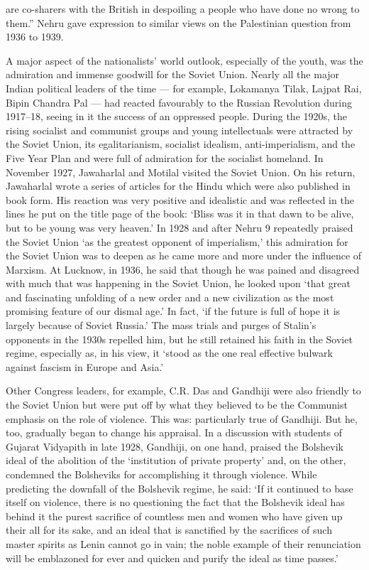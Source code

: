 \begin{multicols}{2}
are co-sharers with the British in despoiling a people who have done no wrong to them.'' Nehru gave expression to similar views on the Palestinian question from 1936 to 1939. 

A major aspect of the nationalists' world outlook, especially of the youth, was the admiration and immense goodwill for the Soviet Union. Nearly all the major Indian political leaders of the time --- for example, Lokamanya Tilak, Lajpat Rai, Bipin Chandra Pal --- had reacted favourably to the Russian Revolution during 1917--18, seeing in it the success of an oppressed people. During the 1920s, the rising socialist and communist groups and young intellectuals were attracted by the Soviet Union, its egalitarianism, socialist idealism, anti-imperialism, and the Five Year Plan and were full of admiration for the socialist homeland. In November 1927, Jawaharlal and Motilal visited the Soviet Union. On his return, Jawaharlal wrote a series of articles for the Hindu which were also published in book form. His reaction was very positive and idealistic and was reflected in the lines he put on the title page of the book: `Bliss was it in that dawn to be alive, but to be young was very heaven.' In 1928 and after Nehru 9 repeatedly praised the Soviet Union `as the greatest opponent of imperialism,' this admiration for the Soviet Union was to deepen as he came more and more under the influence of Marxism. At Lucknow, in 1936, he said that though he was pained and disagreed with much that was happening in the Soviet Union, he looked upon `that great and fascinating unfolding of a new order and a new civilization as the most promising feature of our dismal age.' In fact, `if the future is full of hope it is largely because of Soviet Russia.' The mass trials and purges of Stalin's opponents in the 1930s repelled him, but he still retained his faith in the Soviet regime, especially as, in his view, it `stood as the one real effective bulwark against fascism in Europe and Asia.' 

Other Congress leaders, for example, C.R. Das and Gandhiji were also friendly to the Soviet Union but were put off by what they believed to be the Communist emphasis on the role of violence. This was: particularly true of Gandhiji. But he, too, gradually began to change his appraisal. In a discussion with students of Gujarat Vidyapith in late 1928, Gandhiji, on one hand, praised the Bolshevik ideal of the abolition of the `institution of private property' and, on the other, condemned the Bolsheviks for accomplishing it through violence. While predicting the downfall of the Bolshevik regime, he said: `If it continued to base itself on violence, there is no questioning the fact that the Bolshevik ideal has behind it the purest sacrifice of countless men and women who have given up their all for its sake, and an ideal that is sanctified by the sacrifices of such master spirits as Lenin cannot go in vain; the noble example of their renunciation will be emblazoned for ever and quicken and purify the ideal as time passes.' 


\end{multicols}
